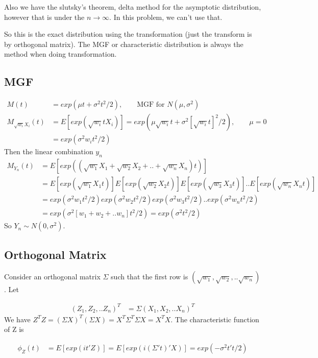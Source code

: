\documentclass[11pt]{article} %
\begin{document}
Also we have the slutsky's theorem, delta method for the asymptotic distribution, however that is under the $n \rightarrow \infty$. In this problem, we can't use that.

So this is the exact distribution using the transformation (just the transform is by orthogonal matrix). The MGF or characteristic distribution is always the method when doing transformation.

\subsection{MGF}

\begin{align*}
	M(t) &= exp(\mu t + \sigma^2 t^2/2), \qquad \text{MGF for } N(\mu, \sigma^2)\\
	M_{\sqrt{w_i}X_i}(t) &= E[exp(\sqrt{w_i} t X_i)] = exp(\mu \sqrt{w_i} t + \sigma^2 [\sqrt{w_i} t]^2/2), \qquad \mu=0 \\
	&= exp(\sigma^2 w_i t^2/2)
\end{align*}
Then the linear combination $y_n$
\begin{align*}
	M_{Y_n}(t) &= E[exp \left( (\sqrt{w_1} X_1 + \sqrt{w_2} X_2 + .. + \sqrt{w_n} X_n) t \right)] \\
	&= E[exp(\sqrt{w_1} X_1 t)] E[exp(\sqrt{w_2} X_2 t)] E[exp(\sqrt{w_3} X_3 t)].. E[exp(\sqrt{w_n} X_n t)] \\
	&= exp(\sigma^2 w_1 t^2/2) exp(\sigma^2 w_2 t^2/2) exp(\sigma^2 w_3 t^2/2).. exp(\sigma^2 w_n t^2/2) \\
	&= exp(\sigma^2 [w_1+ w_2 + .. w_n] t^2/2) = exp(\sigma^2 t^2/2)
\end{align*}
So $Y_n \sim N(0, \sigma^2)$. 

\subsection{Orthogonal Matrix}

Consider an orthogonal matrix $\Sigma$ such that the first row is $(\sqrt{w_1}, \sqrt{w_2},.. \sqrt{w_n})$. Let

\begin{align*}
	(Z_1, Z_2,.. Z_n)^T &= \Sigma  (X_1, X_2,.. X_n)^T
\end{align*}
We have $Z^T Z = (\Sigma X)^T (\Sigma X) = X^T \Sigma^T \Sigma X = X^T X$. The characteristic function of Z is 

\begin{align*}
	\phi_Z(t) &= E[exp(i t'Z)] = E[exp(i (\Sigma' t)' X)] = exp(-\sigma^2 t't/2)
\end{align*}
\end{document}
